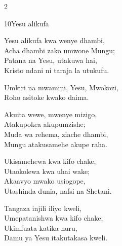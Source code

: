 \begin{multicols}{2}
\begin{hymn}{10}{Yesu alikufa}{}
\begin{stanza}
Yesu alikufa kwa wenye dhambi,\\
Acha dhambi zako umwone Mungu;\\
Patana na Yesu, utakuwa hai,\\
Kristo ndani ni taraja la utukufu.
\end{stanza}
\begin{chorus}
Umkiri na mwamini, Yesu, Mwokozi,\\
Roho asitoke kwako daima.
\end{chorus}
\begin{stanza}
Akuita wewe, mwenye mizigo,\\
Atakupokea akupumzishe;\\
Muda wa rehema, ziache dhambi,\\
Mungu atakusamehe akupe raha.
\end{stanza}
\begin{stanza}
Ukisamehewa kwa kifo chake,\\
Utaokolewa kwa uhai wake;\\
Akaavyo mwako usiogope,\\
Utashinda dunia, nafsi na Shetani.
\end{stanza}
\begin{stanza}
Tangaza injili iliyo kweli,\\
Umepatanishwa kwa kifo chake;\\
Ukimfuata katika nuru,\\
Damu ya Yesu itakutakasa kweli.
\end{stanza}
\end{hymn}


\end{multicols}

